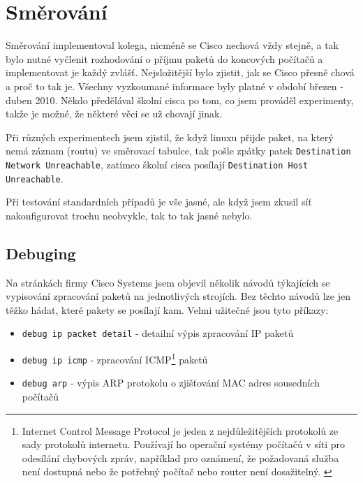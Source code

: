 \section{Směrování} \label{prijmiEthernetove}
Směrování implementoval kolega, nicméně se Cisco nechová vždy stejně, a tak bylo nutné vyčlenit rozhodování o příjmu paketů do koncových počítačů a implementovat je každý zvlášť. Nejsložitější bylo zjistit, jak se Cisco přesně chová a proč to tak je. Všechny vyzkoumané informace byly platné v období březen - duben 2010. Někdo předělával školní cisca po tom, co jsem prováděl experimenty, takže je možné, že některé věci se už chovají jinak.

Při různých experimentech jsem zjistil, že když linuxu přijde paket, na který nemá záznam (routu) ve směrovací tabulce, tak pošle zpátky patek \verb|Destination Network Unreachable|, zatímco školní cisca posílají \verb|Destination Host Unreachable|.

Při testování standardních případů je vše jasné, ale když jsem zkusil síť nakonfigurovat trochu neobvykle, tak to tak jasné nebylo.


\subsection{Debuging}
Na stránkách firmy Cisco Systems jsem objevil několik návodů týkajících se vypisování zpracování paketů na jednotlivých strojích. Bez těchto návodů lze jen těžko hádat, které pakety se posílají kam. Velmi užitečné jsou tyto příkazy:

\begin{itemize}
 \item \verb|debug ip packet detail| - detailní výpis zpracování IP paketů 
 \item \verb|debug ip icmp| - zpracování ICMP\footnote{Internet Control Message Protocol je jeden z nejdůležitějších protokolů ze sady protokolů internetu. Používají ho operační systémy počítačů v síti pro odesílání chybových zpráv, například pro oznámení, že požadovaná služba není dostupná nebo že potřebný počítač nebo router není dosažitelný. \cite{wiki:icmp}} paketů
 \item \verb|debug arp| - výpis ARP protokolu o zjišťování MAC adres sousedních počítačů
\end{itemize}


